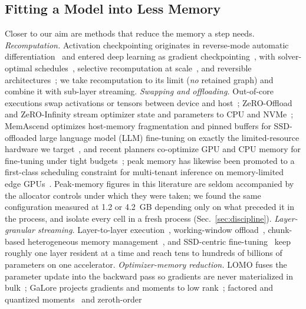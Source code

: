 \documentclass[journal]{IEEEtran}
\begin{document}
\subsection{Fitting a Model into Less Memory}
Closer to our aim are methods that reduce the memory a step needs.
\emph{Recomputation.} Activation checkpointing originates in reverse-mode
automatic differentiation~\cite{griewank2000revolve} and entered deep
learning as gradient checkpointing~\cite{chen2016training}, with
solver-optimal schedules~\cite{jain2020checkmate,shah2021monet}, selective
recomputation at scale~\cite{korthikanti2023selective}, and reversible
architectures~\cite{gomez2017reversible}; we take recomputation to its limit
(\emph{no} retained graph) and combine it with sub-layer streaming.
\emph{Swapping and offloading.} Out-of-core executions swap activations or
tensors between device and host~\cite{rhu2016vdnn,le2018tflms,huang2020swapadvisor,peng2020capuchin,wang2018superneurons};
ZeRO-Offload and ZeRO-Infinity stream optimizer state and parameters to CPU
and NVMe~\cite{ren2021zerooffload,rajbhandari2021zeroinfinity}; MemAscend
optimizes host-memory fragmentation and pinned buffers for SSD-offloaded
large language model (LLM) fine-tuning on exactly the limited-resource hardware we
target~\cite{liaw2026memascend}, and recent planners co-optimize GPU and
CPU memory for fine-tuning under tight
budgets~\cite{ding2026heteropipeline,zhang2026memorysafe}; peak memory
has likewise been promoted to a first-class scheduling constraint for
multi-tenant inference on memory-limited edge GPUs~\cite{lee2026peakmem}.
Peak-memory figures in this literature are seldom accompanied by the
allocator controls under which they were taken; we found the same
configuration measured at 1.2 or 4.2~GB depending only on what preceded it
in the process, and isolate every cell in a fresh process
(Sec.~\ref{sec:discipline}).
\emph{Layer-granular streaming.} Layer-to-layer
execution~\cite{pudipeddi2020l2l}, working-window
offload~\cite{sun2022stronghold}, chunk-based heterogeneous memory
management~\cite{fang2023patrickstar}, and SSD-centric
fine-tuning~\cite{liao2025lohan} keep roughly one layer resident at a time
and reach tens to hundreds of billions of parameters on one accelerator.
\emph{Optimizer-memory reduction.} LOMO fuses the parameter update into the
backward pass so gradients are never materialized in
bulk~\cite{lv2024lomo,lv2024adalomo}; GaLore projects gradients and moments
to low rank~\cite{zhao2024galore}; factored and quantized
moments~\cite{shazeer2018adafactor,dettmers2022eightbit} and zeroth-order
\end{document}
